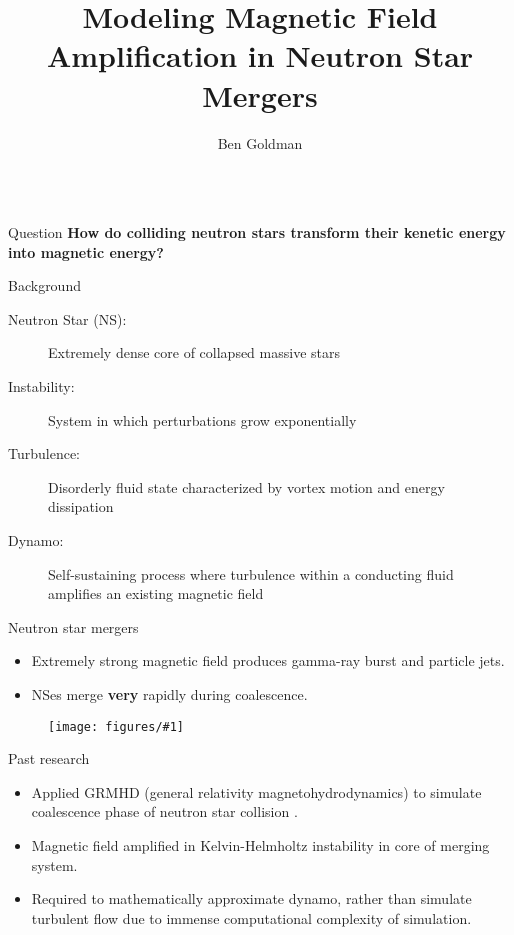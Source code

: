 \documentclass{beamer}
\title{Modeling Magnetic Field Amplification in Neutron Star Mergers}
\author{Ben Goldman}
\institute{Columbia University}
\newcommand{\myfig}[4]{
  \begin{figure}
    \centering
    \texttt{[image: figures/\#1]}
    \def\param{#4}
    \ifx\param\empty
    \else
      \caption{\param}
    \fi
    \label{fig:#3}
  \end{figure}
}
\begin{document}
\begin{frame}[t]
  \begin{columns}
    \begin{column}{0.5\textwidth}
      \begin{block}{Question}
        {\bf How do colliding neutron stars transform their kenetic energy into magnetic energy?}
      \end{block}
      \begin{block}{Background}
        \begin{description}
          \item[Neutron Star (NS):] Extremely dense core of collapsed massive stars
          \item[Instability:] System in which perturbations grow exponentially
          \item[Turbulence:] Disorderly fluid state characterized by vortex motion and energy dissipation
          \item[Dynamo:] Self-sustaining process where turbulence within a conducting fluid amplifies an existing magnetic field
        \end{description}
      \end{block}
      \begin{block}{Neutron star mergers}
        \begin{itemize}
          \item Extremely strong magnetic field produces gamma-ray burst and particle jets.
          \item NSes merge {\bf very} rapidly during coalescence.
        \end{itemize}
        \myfig{timeline.png}{0.7}{timeline}{}
      \end{block}
      \begin{block}{Past research}
        \begin{itemize}
          \item Applied GRMHD (general relativity magnetohydrodynamics) to simulate coalescence phase of neutron star collision \citep{palenzuela2022}.
          \item Magnetic field amplified in Kelvin-Helmholtz instability in core of merging system.
          \item Required to mathematically approximate dynamo, rather than simulate turbulent flow due to immense computational complexity of simulation.
        \end{itemize}

\end{block}
\end{column}
\end{columns}
\end{frame}
\end{document}
